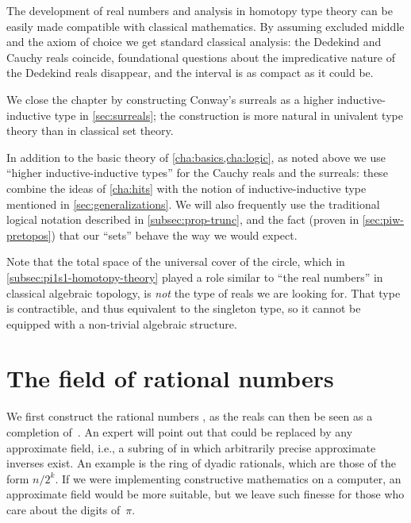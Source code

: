 The development of real numbers and analysis in homotopy type theory can be easily made compatible with classical mathematics. By assuming excluded middle and the axiom of choice we get standard classical analysis: the Dedekind and Cauchy reals coincide, foundational questions about the impredicative nature of the Dedekind reals disappear, and the interval is as compact as it could be.

We close the chapter by constructing Conway's surreals as a higher inductive-inductive type in \autoref{sec:surreals};
the construction is more natural in univalent type theory than in  classical set theory.

In addition to the basic theory of \autoref{cha:basics,cha:logic}, as noted above we use ``higher inductive-inductive types'' for the Cauchy reals and the surreals: these combine the ideas of \autoref{cha:hits} with the notion of inductive-inductive type mentioned in \autoref{sec:generalizations}.
We will also frequently use the traditional logical notation described in \autoref{subsec:prop-trunc}, and the fact (proven in \autoref{sec:piw-pretopos}) that our ``sets'' behave the way we would expect.

Note that the total space of the universal cover of the circle, which
in \autoref{subsec:pi1s1-homotopy-theory} played a role similar to ``the real numbers'' in
classical algebraic topology, is \emph{not} the type of reals we are looking for. That
type is contractible, and thus equivalent to the singleton type, so it cannot be equipped
with a non-trivial algebraic structure.



\section{The field of rational numbers}
\label{sec:field-rati-numb}

We first construct the rational numbers \Q, as the reals can then be seen as a completion
of~\Q. An expert will point out that \Q could be replaced by any approximate field,
i.e., a subring of \Q in which arbitrarily precise approximate inverses
exist. An example is the
ring of dyadic rationals,
which are those of the form $n/2^k$. 
If we were implementing constructive mathematics on a computer,
an approximate field would be more suitable, but we leave such finesse for those
who care about the digits of~$\pi$.

